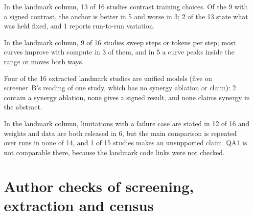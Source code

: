 \documentclass[acmsmall,screen]{acmart}
\begin{document}
In the landmark column, 13 of 16 studies contrast training choices. Of the 9 with a signed contrast, the anchor is better in 5 and worse in 3; 2 of the 13 state what was held fixed, and 1 reports run-to-run variation. %

In the landmark column, 9 of 16 studies sweep steps or tokens per step; most curves improve with compute in 3 of them, and in 5 a curve peaks inside the range or moves both ways. %

Four of the 16 extracted landmark studies are unified models (five on screener~B's reading of one study, which has no synergy ablation or claim): 2 contain a synergy ablation, none gives a signed result, and none claims synergy in the abstract. %

In the landmark column, limitations with a failure case are stated in 12 of 16 and weights and data are both released in 6, but the main comparison is repeated over runs in none of 14, and 1 of 15 studies makes an unsupported claim. QA1 is not comparable there, because the landmark code links were not checked. %

\section{Author checks of screening, extraction and census}
\label{sec:s-author-checks}
\end{document}
